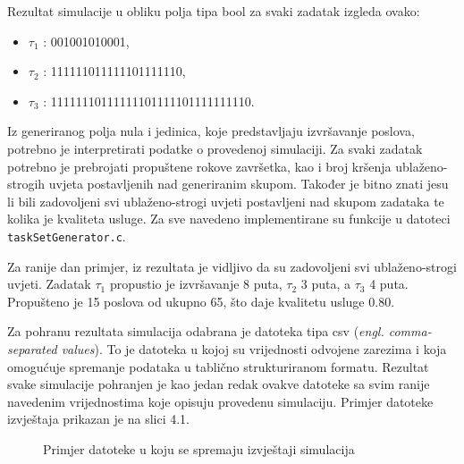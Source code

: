\documentclass[../zavrsni.tex]{subfiles}
\begin{document}
Rezultat simulacije u obliku polja tipa bool za svaki zadatak izgleda ovako:

\begin{itemize}
        \item[] $\tau_1$ : 001001010001,
        \item[] $\tau_2$ : 111111011111101111110,
        \item[] $\tau_3$ : 11111110111111101111101111111110.
\end{itemize}

Iz generiranog polja nula i jedinica, koje predstavljaju izvršavanje poslova, potrebno je interpretirati podatke o provedenoj simulaciji.
Za svaki zadatak potrebno je prebrojati propuštene rokove završetka, kao i broj kršenja ublaženo-strogih uvjeta postavljenih nad generiranim skupom.
Također je bitno znati jesu li bili zadovoljeni svi ublaženo-strogi uvjeti 
postavljeni nad skupom zadataka te kolika je kvaliteta usluge. Za sve navedeno implementirane su funkcije u datoteci \texttt{taskSetGenerator.c}.

Za ranije dan primjer, iz rezultata je vidljivo da su zadovoljeni svi ublaženo-strogi uvjeti. Zadatak $\tau_1$ 
propustio je izvršavanje 8 puta, $\tau_2$ 3 puta, a $\tau_3$ 4 puta. Propušteno je 15 poslova od ukupno 65, što
daje kvalitetu usluge 0.80. 

Za pohranu rezultata simulacija odabrana je datoteka tipa csv (\textit{engl. comma-separated values}). To je datoteka u kojoj su vrijednosti odvojene zarezima 
i koja omogućuje spremanje podataka u tablično strukturiranom formatu. Rezultat svake simulacije pohranjen je kao jedan redak ovakve datoteke sa svim ranije 
navedenim vrijednostima koje opisuju provedenu simulaciju. Primjer datoteke izvještaja prikazan je na slici 4.1.

\begin{figure}[!htb]
    \caption{\label{fig:my-label} Primjer datoteke u koju se spremaju izvještaji simulacija}
  \end{figure}
\end{document}
